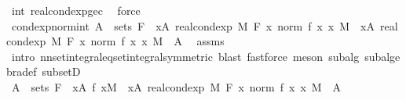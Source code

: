 \begin{isabellebody}
\ int\ real{\isacharunderscore}{\kern0pt}cond{\isacharunderscore}{\kern0pt}exp{\isacharunderscore}{\kern0pt}ge{\isacharunderscore}{\kern0pt}c\ \isamarkupfalse%
\ force\isanewline
\ \ \isamarkupfalse%
\ cond{\isacharunderscore}{\kern0pt}exp{\isacharunderscore}{\kern0pt}norm{\isacharunderscore}{\kern0pt}int{\isacharcolon}{\kern0pt}\ {\isachardoublequoteopen}A\ {\isasymin}\ sets\ F\ {\isasymLongrightarrow}\ {\isacharparenleft}{\kern0pt}{\isasymintegral}x{\isasymin}A{\isachardot}{\kern0pt}\ real{\isacharunderscore}{\kern0pt}cond{\isacharunderscore}{\kern0pt}exp\ M\ F\ {\isacharparenleft}{\kern0pt}{\isasymlambda}x{\isachardot}{\kern0pt}\ norm\ {\isacharparenleft}{\kern0pt}f\ x{\isacharparenright}{\kern0pt}{\isacharparenright}{\kern0pt}\ x\ {\isasympartial}M{\isacharparenright}{\kern0pt}\ {\isacharequal}{\kern0pt}\ {\isacharparenleft}{\kern0pt}{\isasymintegral}\isactrlsup {\isacharplus}{\kern0pt}x{\isasymin}A{\isachardot}{\kern0pt}\ real{\isacharunderscore}{\kern0pt}cond{\isacharunderscore}{\kern0pt}exp\ M\ F\ {\isacharparenleft}{\kern0pt}{\isasymlambda}x{\isachardot}{\kern0pt}\ norm\ {\isacharparenleft}{\kern0pt}f\ x{\isacharparenright}{\kern0pt}{\isacharparenright}{\kern0pt}\ x\ {\isasympartial}M{\isacharparenright}{\kern0pt}{\isachardoublequoteclose}\ \ A\ \isamarkupfalse%
\ assms\ \isamarkupfalse%
\ {\isacharparenleft}{\kern0pt}intro\ nn{\isacharunderscore}{\kern0pt}set{\isacharunderscore}{\kern0pt}integral{\isacharunderscore}{\kern0pt}eq{\isacharunderscore}{\kern0pt}set{\isacharunderscore}{\kern0pt}integral{\isacharbrackleft}{\kern0pt}symmetric{\isacharbrackright}{\kern0pt}{\isacharcomma}{\kern0pt}\ blast{\isacharcomma}{\kern0pt}\ fastforce{\isacharparenright}{\kern0pt}\ {\isacharparenleft}{\kern0pt}meson\ subalg\ subalgebra{\isacharunderscore}{\kern0pt}def\ subsetD{\isacharparenright}{\kern0pt}\isanewline
\ \ \isanewline
\ \ \isamarkupfalse%
\ {\isachardoublequoteopen}A\ {\isasymin}\ sets\ F\ {\isasymLongrightarrow}\ {\isasymintegral}\isactrlsup {\isacharplus}{\kern0pt}x{\isasymin}A{\isachardot}{\kern0pt}\ {\isasymbar}f\ x{\isasymbar}{\isasympartial}M\ {\isacharequal}{\kern0pt}\ {\isasymintegral}\isactrlsup {\isacharplus}{\kern0pt}x{\isasymin}A{\isachardot}{\kern0pt}\ real{\isacharunderscore}{\kern0pt}cond{\isacharunderscore}{\kern0pt}exp\ M\ F\ {\isacharparenleft}{\kern0pt}{\isasymlambda}x{\isachardot}{\kern0pt}\ norm\ {\isacharparenleft}{\kern0pt}f\ x{\isacharparenright}{\kern0pt}{\isacharparenright}{\kern0pt}\ x\ {\isasympartial}M{\isachardoublequoteclose}\ \ A\ \isamarkupfalse%

\end{isabellebody}
